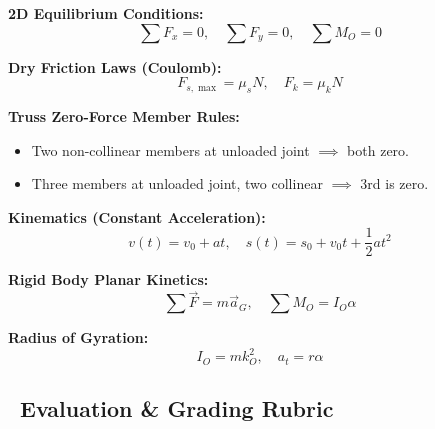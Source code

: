 \documentclass[11pt, a4paper, titlepage=false]{scrartcl}
\begin{document}
\begin{minipage}{0.48\textwidth}
    \begin{tcolorbox}[
        enhanced,
        colback=BgLight,
        colframe=PrimaryDark,
        arc=3pt,
        boxrule=1.0pt,
        title={\small\bfseries\color{white}\faBook\ Statics Formula Quick Reference},
        coltitle=white,
        colbacktitle=PrimaryDark,
        top=6pt, bottom=6pt, left=8pt, right=8pt
    ]
        \small\color{NeutralDark}
        \textbf{2D Equilibrium Conditions:}
        \[ \sum F_x = 0, \quad \sum F_y = 0, \quad \sum M_O = 0 \]
        
        \textbf{Dry Friction Laws (Coulomb):}
        \[ F_{s,\max} = \mu_s N, \quad F_k = \mu_k N \]

        \textbf{Truss Zero-Force Member Rules:}
        \begin{itemize}[leftmargin=*]
            \item Two non-collinear members at unloaded joint $\implies$ both zero.
            \item Three members at unloaded joint, two collinear $\implies$ 3rd is zero.
        \end{itemize}
    \end{tcolorbox}
\end{minipage}%
\hfill
\begin{minipage}{0.48\textwidth}
    \begin{tcolorbox}[
        enhanced,
        colback=BgLight,
        colframe=SecondaryTeal,
        arc=3pt,
        boxrule=1.0pt,
        title={\small\bfseries\color{white}\faBook\ Dynamics Formula Quick Reference},
        coltitle=white,
        colbacktitle=SecondaryTeal,
        top=6pt, bottom=6pt, left=8pt, right=8pt
    ]
        \small\color{NeutralDark}
        \textbf{Kinematics (Constant Acceleration):}
        \[ v(t) = v_0 + a t, \quad s(t) = s_0 + v_0 t + \frac{1}{2}a t^2 \]
        
        \textbf{Rigid Body Planar Kinetics:}
        \[ \sum \vec{F} = m \vec{a}_G, \quad \sum M_O = I_O \alpha \]

        \textbf{Radius of Gyration:}
        \[ I_O = m k_O^2, \quad a_t = r \alpha \]
    \end{tcolorbox}
\end{minipage}

\vspace{12pt}

\subsection*{\textcolor{PrimaryDark}{\faCheckCircle\ Evaluation \& Grading Rubric}}
\end{document}
